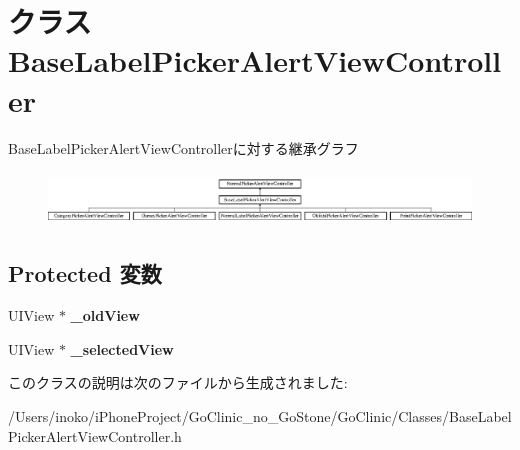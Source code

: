 \hypertarget{interface_base_label_picker_alert_view_controller}{
\section{クラス BaseLabelPickerAlertViewController}
\label{interface_base_label_picker_alert_view_controller}
}
BaseLabelPickerAlertViewControllerに対する継承グラフ\begin{figure}[H]
\begin{center}
\leavevmode
\includegraphics[height=1.411765cm]{interface_base_label_picker_alert_view_controller}
\end{center}
\end{figure}
\subsection*{Protected 変数}
\begin{DoxyCompactItemize}
\item 
\hypertarget{interface_base_label_picker_alert_view_controller_a038c417b4ca94a77edc77b3893b18991}{
UIView $\ast$ {\bfseries \_\-oldView}}
\label{interface_base_label_picker_alert_view_controller_a038c417b4ca94a77edc77b3893b18991}

\item 
\hypertarget{interface_base_label_picker_alert_view_controller_ac151601b5e22eb5c4bbd126131ffdc82}{
UIView $\ast$ {\bfseries \_\-selectedView}}
\label{interface_base_label_picker_alert_view_controller_ac151601b5e22eb5c4bbd126131ffdc82}

\end{DoxyCompactItemize}


このクラスの説明は次のファイルから生成されました:\begin{DoxyCompactItemize}
\item 
/Users/inoko/iPhoneProject/GoClinic\_\-no\_\-GoStone/GoClinic/Classes/BaseLabelPickerAlertViewController.h\end{DoxyCompactItemize}
